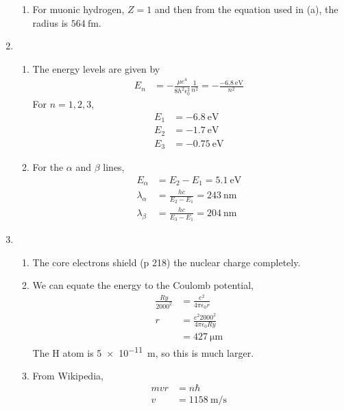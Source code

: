 \documentclass{homework}
\begin{document}
\begin{enumerate}
\begin{enumerate}
			\item For muonic hydrogen, $Z=1$ and then from the equation used in (a), the radius is $\SI{564}{\femto\meter}$.
		\end{enumerate} 
	
		\item  \begin{enumerate}
			\item The energy levels are given by \begin{align*}
				E_n & = - \frac{\mu e^4}{8 h^2 \epsilon_0^2} \frac{1}{n^2} = -\frac{\SI{-6.8}{\eV}}{n^2}
			\end{align*}
			For $n=1, 2, 3$, \begin{align*}
				E_1 & = -\SI{6.8}{\eV} \\
				E_2 & = -\SI{1.7}{\eV} \\
				E_3 & = -\SI{0.75}{\eV}
			\end{align*}
		
			\item For the $\alpha$ and $\beta$ lines, \begin{align*}
				E_\alpha & = E_2 - E_1 = \SI{5.1}{\eV} \\
				\lambda_\alpha & = \frac{hc}{E_2 - E_1} = \SI{243}{\nm} \\
				\lambda_\beta & = \frac{hc}{E_3 - E_1} = \SI{204}{\nm}
			\end{align*}
		\end{enumerate}
		
		\item \begin{enumerate}
			\item The core electrons shield (p 218) the nuclear charge completely.
			
			\item We can equate the energy to the Coulomb potential, \begin{align*}
				\frac{Ry}{2000^2} & = \frac{e^2}{4 \pi \epsilon_0 r} \\
				r & = {\frac{e^2 2000^2}{4 \pi \epsilon_0 Ry}} \\
					& = \SI{427}{\um}
			\end{align*}
			The H atom is \SI{5e-11}{\m}, so this is much larger.
			
			\item From Wikipedia, \begin{align*}
				mvr & = n\hbar \\
				v & = \SI{1158}{\m\per\s}
			\end{align*}
		

\end{enumerate}
\end{enumerate}
\end{document}
